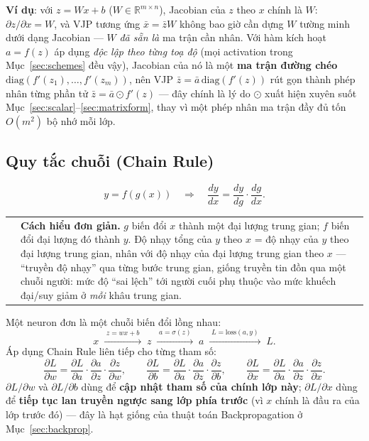\documentclass[12pt,a4paper]{report}
\makeatletter
\newenvironment{tructiep}[1][Cách hiểu đơn giản]
  {\par\smallskip\noindent\begin{tabular}{@{}p{0.35em}@{\hspace{6pt}}p{\dimexpr\linewidth-1.9em\relax}@{}}
   \textcolor{boxln}{\rule{2pt}{\baselineskip}} & \textbf{#1.}\enspace\ignorespaces}
  {\end{tabular}\par\smallskip}
\makeatother
\begin{document}
\textbf{Ví dụ}: với $z=Wx+b$ ($W\in\mathbb R^{m\times n}$), Jacobian của
$z$ theo $x$ chính là $W$: $\partial z/\partial x = W$, và VJP tương ứng
$\bar x=\bar zW$ không bao giờ cần dựng $W$ tường minh dưới dạng Jacobian
--- $W$ \emph{đã sẵn là} ma trận cần nhân. Với hàm kích hoạt $a=f(z)$ áp
dụng \emph{độc lập theo từng toạ độ} (mọi activation trong
Mục~\ref{sec:schemes} đều vậy), Jacobian của nó là một \textbf{ma trận
đường chéo} $\mathrm{diag}(f'(z_1),\ldots,f'(z_m))$, nên VJP
$\bar z=\bar a\,\mathrm{diag}(f'(z))$ rút gọn thành phép nhân từng phần tử
$\bar z=\bar a\odot f'(z)$ --- đây chính là lý do $\odot$ xuất hiện xuyên
suốt Mục~\ref{sec:scalar}--\ref{sec:matrixform}, thay vì một phép nhân ma
trận đầy đủ tốn $O(m^2)$ bộ nhớ mỗi lớp.

\subsection{Quy tắc chuỗi (Chain Rule)}
\label{sec:chainrule}

$$y = f(g(x)) \quad\Longrightarrow\quad \frac{dy}{dx} = \frac{dy}{dg}\cdot\frac{dg}{dx}.$$

\begin{tructiep}
$g$ biến đổi $x$ thành một đại lượng trung gian; $f$ biến đổi đại lượng đó
thành $y$. Độ nhạy tổng của $y$ theo $x$ = độ nhạy của $y$ theo đại lượng
trung gian, nhân với độ nhạy của đại lượng trung gian theo $x$ --- ``truyền
độ nhạy'' qua từng bước trung gian, giống truyền tin đồn qua một chuỗi
người: mức độ ``sai lệch'' tới người cuối phụ thuộc vào mức khuếch đại/suy
giảm ở \emph{mỗi} khâu trung gian.
\end{tructiep}

Một neuron đơn là một chuỗi biến đổi lồng nhau:
$$x \;\xrightarrow{\;z=wx+b\;}\; z \;\xrightarrow{\;a=\sigma(z)\;}\; a \;\xrightarrow{\;L=\mathrm{loss}(a,y)\;}\; L.$$
Áp dụng Chain Rule liên tiếp cho từng tham số:
$$\frac{\partial L}{\partial w} = \frac{\partial L}{\partial a}\cdot\frac{\partial a}{\partial z}\cdot\frac{\partial z}{\partial w}, \qquad
\frac{\partial L}{\partial b} = \frac{\partial L}{\partial a}\cdot\frac{\partial a}{\partial z}\cdot\frac{\partial z}{\partial b}, \qquad
\frac{\partial L}{\partial x} = \frac{\partial L}{\partial a}\cdot\frac{\partial a}{\partial z}\cdot\frac{\partial z}{\partial x}.$$
$\partial L/\partial w$ và $\partial L/\partial b$ dùng để \textbf{cập nhật
tham số của chính lớp này}; $\partial L/\partial x$ dùng để \textbf{tiếp
tục lan truyền ngược sang lớp phía trước} (vì $x$ chính là đầu ra của lớp
trước đó) --- đây là hạt giống của thuật toán Backpropagation ở
Mục~\ref{sec:backprop}.
\end{document}
